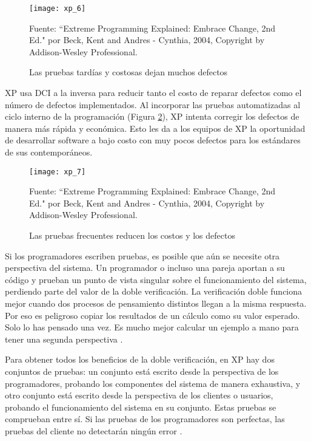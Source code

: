 \begin{spacing}{1.5}
				\begin{figure}[H]
					\centering
					\texttt{[image: xp\_6]}
					\caption {\centering \small{Las pruebas tardías y costosas dejan muchos defectos}} \label{figure:chaperII_7}
					\small {Fuente: ``Extreme Programming Explained: Embrace Change, 2nd Ed." por Beck, Kent and Andres - Cynthia, 2004, Copyright by Addison-Wesley Professional.}
				\end{figure}
			
			XP usa DCI a la inversa para reducir tanto el costo de reparar defectos como el número de defectos implementados. Al incorporar las pruebas automatizadas al ciclo interno de la programación (Figura \ref{figure:chaperII_8}), XP intenta corregir los defectos de manera más rápida y económica. Esto les da a los equipos de XP la oportunidad de desarrollar software a bajo costo con muy pocos defectos para los estándares de sus contemporáneos.
			
			\begin{figure}[H]
				\centering
				\texttt{[image: xp\_7]}
				\caption {\centering \small{Las pruebas frecuentes reducen los costos y los defectos}} \label{figure:chaperII_8}
				\small {Fuente: ``Extreme Programming Explained: Embrace Change, 2nd Ed." por Beck, Kent and Andres - Cynthia, 2004, Copyright by Addison-Wesley Professional.}
			\end{figure}
		
		Si los programadores escriben pruebas, es posible que aún se necesite otra perspectiva del sistema. Un programador o incluso una pareja aportan a su código y prueban un punto de vista singular sobre el funcionamiento del sistema, perdiendo parte del valor de la doble verificación. La verificación doble funciona mejor cuando dos procesos de pensamiento distintos llegan a la misma respuesta. Por eso es peligroso copiar los resultados de un cálculo como su valor esperado. Solo lo has pensado una vez. Es mucho mejor calcular un ejemplo a mano para tener una segunda perspectiva \cite{chap2_extreme_programming}.
		
		Para obtener todos los beneficios de la doble verificación, en XP hay dos conjuntos de pruebas: un conjunto está escrito desde la perspectiva de los programadores, probando los componentes del sistema de manera exhaustiva, y otro conjunto está escrito desde la perspectiva de los clientes o usuarios, probando el funcionamiento del sistema en su conjunto. Estas pruebas se comprueban entre sí. Si las pruebas de los programadores son perfectas, las pruebas del cliente no detectarán ningún error \cite{chap2_extreme_programming}.
		

\end{spacing}
